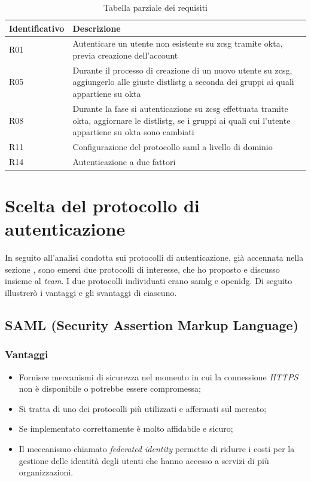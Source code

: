 \begin{center}
    \begin{table}[h]
    \def\arraystretch{2}
    \begin{tabular}{| p{3cm} | p{9cm} |} %
        \hline
        \textbf{Identificativo} & \textbf{Descrizione} \\ \hline  
        R01 & Autenticare un utente non esistente su \gls{zcsg} tramite \gls{okta}, previa creazione dell'account\\ \hline
        R05 & Durante il processo di creazione di un nuovo utente su \gls{zcsg}, aggiungerlo alle giuste \gls{distlistg} a seconda dei gruppi ai quali appartiene su \gls{okta}\\ \hline
        R08 & Durante la fase si autenticazione su \gls{zcsg} effettuata tramite \gls{okta}, aggiornare le \gls{distlistg}, se i gruppi ai quali cui l'utente appartiene su \gls{okta} sono cambiati\\ \hline
        R11 & Configurazione del protocollo \gls{saml} a livello di dominio\\ \hline
        R14 & Autenticazione a due fattori\\ \hline 
    \end{tabular}
    \caption{Tabella parziale dei requisiti}
    \end{table}
\end{center}

\section{Scelta del protocollo di autenticazione}
In seguito all'analisi condotta sui protocolli di autenticazione, già accennata nella sezione , sono emersi due protocolli di interesse, che ho proposto e discusso insieme al \textit{team}.
I due protocolli individuati erano \gls{samlg} e \gls{openidg}. Di seguito illustrerò i vantaggi e gli svantaggi di ciascuno.

\subsection{SAML (Security Assertion Markup Language)}
    \subsubsection{Vantaggi}
    \begin{itemize}
        \item Fornisce meccanismi di sicurezza nel momento in cui la connessione \textit{HTTPS} non è disponibile o potrebbe essere compromessa;
        \item Si tratta di uno dei protocolli più utilizzati e affermati sul mercato;
        \item Se implementato correttamente è molto affidabile e sicuro;
        \item Il meccanismo chiamato \textit{federated identity} permette di ridurre i costi per la gestione delle identità degli utenti che hanno accesso a servizi di più organizzazioni.
    \end{itemize}
